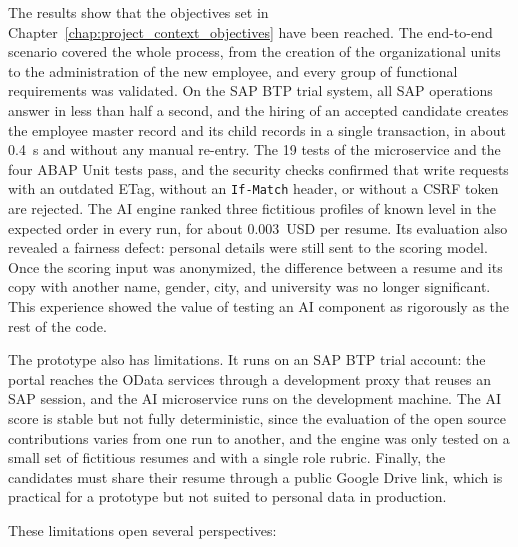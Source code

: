 The results show that the objectives set in Chapter~\ref{chap:project_context_objectives} have been reached. The end-to-end scenario covered the whole process, from the creation of the organizational units to the administration of the new employee, and every group of functional requirements was validated. On the SAP BTP trial system, all SAP operations answer in less than half a second, and the hiring of an accepted candidate creates the employee master record and its child records in a single transaction, in about 0.4~s and without any manual re-entry. The 19 tests of the microservice and the four ABAP Unit tests pass, and the security checks confirmed that write requests with an outdated ETag, without an \texttt{If-Match} header, or without a CSRF token are rejected. The AI engine ranked three fictitious profiles of known level in the expected order in every run, for about 0.003~USD per resume. Its evaluation also revealed a fairness defect: personal details were still sent to the scoring model. Once the scoring input was anonymized, the difference between a resume and its copy with another name, gender, city, and university was no longer significant. This experience showed the value of testing an AI component as rigorously as the rest of the code.

The prototype also has limitations. It runs on an SAP BTP trial account: the portal reaches the OData services through a development proxy that reuses an SAP session, and the AI microservice runs on the development machine. The AI score is stable but not fully deterministic, since the evaluation of the open source contributions varies from one run to another, and the engine was only tested on a small set of fictitious resumes and with a single role rubric. Finally, the candidates must share their resume through a public Google Drive link, which is practical for a prototype but not suited to personal data in production.

These limitations open several perspectives:

